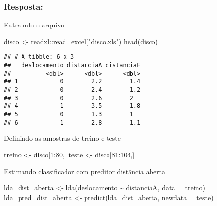 \documentclass[
]{article}
\newenvironment{Shaded}{\begin{snugshade}}{\end{snugshade}}
\newcommand{\AttributeTok}[1]{\textcolor[rgb]{0.77,0.63,0.00}{#1}}
\newcommand{\DecValTok}[1]{\textcolor[rgb]{0.00,0.00,0.81}{#1}}
\newcommand{\FunctionTok}[1]{\textcolor[rgb]{0.00,0.00,0.00}{#1}}
\newcommand{\NormalTok}[1]{#1}
\newcommand{\OtherTok}[1]{\textcolor[rgb]{0.56,0.35,0.01}{#1}}
\newcommand{\SpecialCharTok}[1]{\textcolor[rgb]{0.00,0.00,0.00}{#1}}
\newcommand{\StringTok}[1]{\textcolor[rgb]{0.31,0.60,0.02}{#1}}
\begin{document}
\hypertarget{resposta-2}{%
\subsubsection{Resposta:}\label{resposta-2}}

Extraindo o arquivo

\begin{Shaded}
\begin{Highlighting}[]
\NormalTok{disco }\OtherTok{\textless{}{-}}\NormalTok{ readxl}\SpecialCharTok{::}\FunctionTok{read\_excel}\NormalTok{(}\StringTok{"disco.xls"}\NormalTok{)}
\FunctionTok{head}\NormalTok{(disco)}
\end{Highlighting}
\end{Shaded}

\begin{verbatim}
## # A tibble: 6 x 3
##   deslocamento distanciaA distanciaF
##          <dbl>      <dbl>      <dbl>
## 1            0        2.2        1.4
## 2            0        2.4        1.2
## 3            0        2.6        2  
## 4            1        3.5        1.8
## 5            0        1.3        1  
## 6            1        2.8        1.1
\end{verbatim}

Definindo as amostras de treino e teste

\begin{Shaded}
\begin{Highlighting}[]
\NormalTok{treino }\OtherTok{\textless{}{-}}\NormalTok{ disco[}\DecValTok{1}\SpecialCharTok{:}\DecValTok{80}\NormalTok{,]}
\NormalTok{teste }\OtherTok{\textless{}{-}}\NormalTok{ disco[}\DecValTok{81}\SpecialCharTok{:}\DecValTok{104}\NormalTok{,]}
\end{Highlighting}
\end{Shaded}

Estimando classificador com preditor distância aberta

\begin{Shaded}
\begin{Highlighting}[]
\NormalTok{lda\_dist\_aberta }\OtherTok{\textless{}{-}} \FunctionTok{lda}\NormalTok{(deslocamento }\SpecialCharTok{\textasciitilde{}}\NormalTok{ distanciaA, }\AttributeTok{data =}\NormalTok{ treino)}
\NormalTok{lda\_pred\_dist\_aberta }\OtherTok{\textless{}{-}} \FunctionTok{predict}\NormalTok{(lda\_dist\_aberta, }\AttributeTok{newdata =}\NormalTok{ teste)}
\end{Highlighting}
\end{Shaded}
\end{document}
